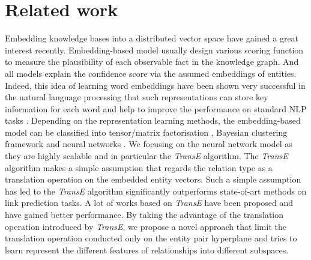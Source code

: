 \documentclass[9pt]{sig-alternate-05-2015}
\begin{document}
\section{Related work} \label{review}
Embedding knowledge bases into a distributed vector space have gained a great interest recently. Embedding-based model usually design various scoring function to measure the plausibility of each observable fact in the knowledge graph. And all models explain the confidence score via the assumed embeddings of entities. Indeed, this idea of learning word embeddings  have been shown very successful in the natural language processing that such representations can store key information for each word and help to improve the performance on standard NLP tasks \cite{bengio_neural_2006}.  Depending on the representation learning methods, the embedding-based model can be classified into tensor/matrix factorisation \cite{singh_relational_2008} \cite{nickel_three-way_2011}, Bayesian clustering framework \cite{kemp_learning_2006} \cite{sutskever_modelling_2009} and neural networks \cite{bordes_learning_2011} \cite{jenatton_latent_2012} \cite{bordes_translating_2013} \cite{socher_reasoning_2013} \cite{bordes_semantic_2014} \cite{wang_knowledge_2014} \cite{lin_learning_2015} \cite{garcia-duran_composing_????}. We focusing on the neural network model as they are highly scalable and in particular the \emph{TransE} \cite{bordes_translating_2013} algorithm. The \emph{TransE} algorithm makes a simple assumption that regards the relation type as a translation operation on the embedded entity vectors. Such a simple assumption has led to the \emph{TransE} algorithm significantly outperforms state-of-art methods on link prediction tasks. A lot of works \cite{fan_transition-based_2014} \cite{wang_knowledge_2014} \cite{lin_learning_2015} \cite{garcia-duran_composing_????}  based on \emph{TransE} have been proposed and have gained better performance. By taking the advantage of the translation operation introduced by \emph{TransE}, we propose a novel approach that limit the translation operation conducted only on the entity pair hyperplane and tries to learn represent the different features of relationships into different subspaces.
\end{document}
